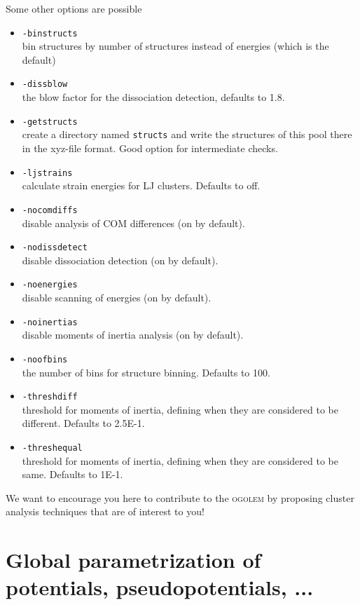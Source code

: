 \documentclass[a4paper,10pt]{scrbook}
\newcommand{\ogo}{\textsc{ogolem}}
\begin{document}
Some other options are possible
\begin{itemize}
  \item \texttt{-binstructs}\\
	bin structures by number of structures instead of energies (which is
the default)
  \item \texttt{-dissblow}\\
	the blow factor for the dissociation detection, defaults to 1.8.
  \item \texttt{-getstructs}\\
	 create a directory named \texttt{structs} and write the structures of
this pool there in the xyz-file format. Good option for intermediate checks.
  \item \texttt{-ljstrains}\\
	calculate strain energies for LJ clusters. Defaults to off.
  \item \texttt{-nocomdiffs}\\
	disable analysis of COM differences (on by default).
  \item \texttt{-nodissdetect}\\
	disable dissociation detection (on by default).
  \item \texttt{-noenergies}\\
	disable scanning of energies (on by default).
  \item \texttt{-noinertias}\\
	disable moments of inertia analysis (on by default).
  \item \texttt{-noofbins}\\
	the number of bins for structure binning. Defaults to 100.
  \item \texttt{-threshdiff}\\
	threshold for moments of inertia, defining when they are considered to
be different. Defaults to 2.5E-1.
  \item \texttt{-threshequal}\\
	threshold for moments of inertia, defining when they are considered to
be same. Defaults to 1E-1.
\end{itemize}

We want to encourage you here to contribute to the \ogo{} by proposing
cluster analysis techniques that are of interest to you!


\chapter{Global parametrization of potentials, pseudopotentials, ...}
\end{document}
